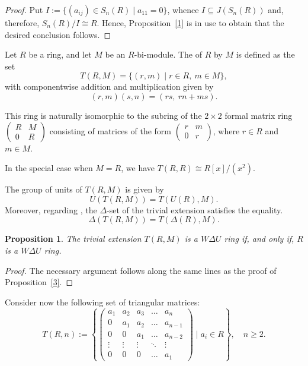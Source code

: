 \documentclass[12pt]{amsart}
\newtheorem{proposition}[theorem]{Proposition}
\theoremstyle{definition}
\begin{document}
\begin{proof}
Put \(I := \{ (a_{ij}) \in S_n(R) \mid a_{11} = 0 \}\), whence \(I\subseteq J(S_n(R))\) and, therefore, \(S_n(R)/I \cong R\). Hence, Proposition~\ref{1} is in use to obtain that the desired conclusion follows.	
\end{proof}

Let \(R\) be a ring, and let \(M\) be an \(R\)-bi-module. The  of \(R\) by \(M\) is defined as the set
\[
T(R, M) = \{ (r, m) \mid r \in R,\ m \in M \},
\]
with componentwise addition and multiplication given by
\[
(r, m)(s, n) = (rs,\ rn + ms).
\]

This ring is naturally isomorphic to the subring of the \(2 \times 2\) formal matrix ring \(\begin{pmatrix} R & M \\ 0 & R \end{pmatrix}\) consisting of matrices of the form
$\begin{pmatrix} r & m \\ 0 & r \end{pmatrix}$, where $r \in R$ and $m \in M$.

\medskip

In the special case when \(M = R\), we have \(T(R, R) \cong R[x]/(x^2)\).

\medskip

The group of units of \(T(R, M)\) is given by
\[
U(T(R, M)) = T(U(R), M).
\]
Moreover, regarding \cite{7}, the \(\Delta\)-set of the trivial extension satisfies the equality.
\[
\Delta(T(R, M)) = T(\Delta(R), M).
\]

\begin{proposition}\label{trivial}
The trivial extension $T(R, M)$ is a \(W\Delta U\) ring if, and only if, $R$ is a \(W\Delta U\) ring.
\end{proposition}

\begin{proof}
The necessary argument follows along the same lines as the proof of Proposition~\ref{3}.
\end{proof}

Consider now the following set of triangular matrices:
\[
T(R,n) := \left\{
\begin{pmatrix}
	a_1 & a_2 & a_3 & \dots & a_n \\
	0 & a_1 & a_2 & \dots & a_{n-1} \\
	0 & 0 & a_1 & \dots & a_{n-2} \\
	\vdots & \vdots & \vdots & \ddots & \vdots \\
	0 & 0 & 0 & \dots & a_1
\end{pmatrix}
\;\Bigg|\; a_i \in R \right\}, \quad n \ge 2.
\]
\end{document}
